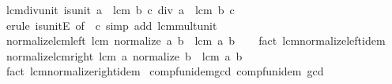 \begin{isabellebody}
\endisatagproof
{\isafoldproof}%
%
\isadelimproof
\isanewline
%
\endisadelimproof
\isanewline
{}\isamarkupfalse%
\ lcm{\isacharunderscore}{\kern0pt}div{\isacharunderscore}{\kern0pt}unit{}{\isacharcolon}{\kern0pt}\ {\isachardoublequoteopen}is{\isacharunderscore}{\kern0pt}unit\ a\ {\isasymLongrightarrow}\ lcm\ b\ {\isacharparenleft}{\kern0pt}c\ div\ a{\isacharparenright}{\kern0pt}\ {\isacharequal}{\kern0pt}\ lcm\ b\ c{\isachardoublequoteclose}\isanewline
%
\isadelimproof
\ \ %
\endisadelimproof
%
\isatagproof
{}\isamarkupfalse%
\ {\isacharparenleft}{\kern0pt}erule\ is{\isacharunderscore}{\kern0pt}unitE\ {\isacharbrackleft}{\kern0pt}of\ {\isacharunderscore}{\kern0pt}\ c{\isacharbrackright}{\kern0pt}{\isacharparenright}{\kern0pt}\ {\isacharparenleft}{\kern0pt}simp\ add{\isacharcolon}{\kern0pt}\ lcm{\isacharunderscore}{\kern0pt}mult{\isacharunderscore}{\kern0pt}unit{}{\isacharparenright}{\kern0pt}%
\endisatagproof
{\isafoldproof}%
%
\isadelimproof
\isanewline
%
\endisadelimproof
\isanewline
{}\isamarkupfalse%
\ normalize{\isacharunderscore}{\kern0pt}lcm{\isacharunderscore}{\kern0pt}left{\isacharcolon}{\kern0pt}\ {\isachardoublequoteopen}lcm\ {\isacharparenleft}{\kern0pt}normalize\ a{\isacharparenright}{\kern0pt}\ b\ {\isacharequal}{\kern0pt}\ lcm\ a\ b{\isachardoublequoteclose}\isanewline
%
\isadelimproof
\ \ %
\endisadelimproof
%
\isatagproof
{}\isamarkupfalse%
\ {\isacharparenleft}{\kern0pt}fact\ lcm{\isachardot}{\kern0pt}normalize{\isacharunderscore}{\kern0pt}left{\isacharunderscore}{\kern0pt}idem{\isacharparenright}{\kern0pt}%
\endisatagproof
{\isafoldproof}%
%
\isadelimproof
\isanewline
%
\endisadelimproof
\isanewline
{}\isamarkupfalse%
\ normalize{\isacharunderscore}{\kern0pt}lcm{\isacharunderscore}{\kern0pt}right{\isacharcolon}{\kern0pt}\ {\isachardoublequoteopen}lcm\ a\ {\isacharparenleft}{\kern0pt}normalize\ b{\isacharparenright}{\kern0pt}\ {\isacharequal}{\kern0pt}\ lcm\ a\ b{\isachardoublequoteclose}\isanewline
%
\isadelimproof
\ \ %
\endisadelimproof
%
\isatagproof
{}\isamarkupfalse%
\ {\isacharparenleft}{\kern0pt}fact\ lcm{\isachardot}{\kern0pt}normalize{\isacharunderscore}{\kern0pt}right{\isacharunderscore}{\kern0pt}idem{\isacharparenright}{\kern0pt}%
\endisatagproof
{\isafoldproof}%
%
\isadelimproof
\isanewline
%
\endisadelimproof
\isanewline
{}\isamarkupfalse%
\ comp{\isacharunderscore}{\kern0pt}fun{\isacharunderscore}{\kern0pt}idem{\isacharunderscore}{\kern0pt}gcd{\isacharcolon}{\kern0pt}\ {\isachardoublequoteopen}comp{\isacharunderscore}{\kern0pt}fun{\isacharunderscore}{\kern0pt}idem\ gcd{\isachardoublequoteclose}\isanewline

\end{isabellebody}
